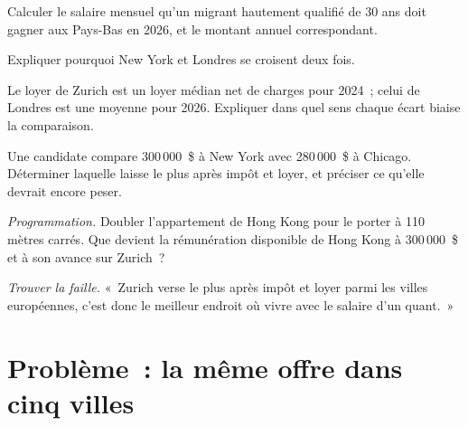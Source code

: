\begin{exercise}[$\star$]\label{exo:in:locations:3}
Calculer le salaire mensuel qu'un migrant hautement qualifié de 30 ans doit gagner aux Pays-Bas en 2026, et le montant annuel correspondant.
\end{exercise}

\begin{exercise}[$\star\star$]\label{exo:in:locations:4}
Expliquer pourquoi New York et Londres se croisent deux fois.
\end{exercise}

\begin{exercise}[$\star\star$]\label{exo:in:locations:5}
Le loyer de Zurich est un loyer médian net de charges pour 2024~; celui de Londres est une moyenne pour 2026. Expliquer dans
quel sens chaque écart biaise la comparaison.
\end{exercise}

\begin{exercise}[$\star\star$]\label{exo:in:locations:6}
Une candidate compare 300\,000~\$ à New York avec 280\,000~\$ à Chicago. Déterminer laquelle laisse le plus après impôt et
loyer, et préciser ce qu'elle devrait encore peser.
\end{exercise}

\begin{exercise}[$\star\star\star$]\label{exo:in:locations:7}
\emph{Programmation.} Doubler l'appartement de Hong Kong pour le porter à 110 mètres carrés. Que devient la rémunération disponible de Hong Kong à 300\,000~\$
et à son avance sur Zurich~?
\end{exercise}

\begin{exercise}[$\star\star\star$]\label{exo:in:locations:8}
\emph{Trouver la faille.} «~Zurich verse le plus après impôt et loyer parmi les villes européennes, c'est donc le meilleur
endroit où vivre avec le salaire d'un quant.~»
\end{exercise}

\section{Problème~: la même offre dans cinq villes}

